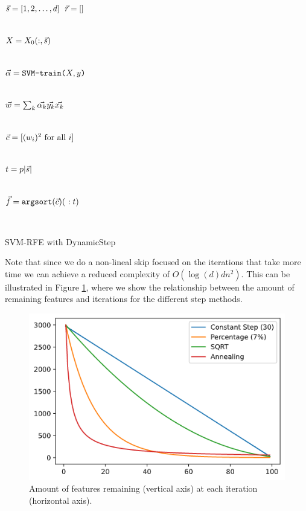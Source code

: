\begin{algorithm}[H]
    \DontPrintSemicolon
      $\vec{s} = [1,2, \dotsc, d]$ 
      $\vec{r} = []$  
        {
            \\
            $X=X_0(:,\vec{s})$\VS

            \\
            $\vec{\alpha} = \texttt{SVM-train(} X, y \texttt{)}$\VS

            \\
            $\vec{w} = \sum_k{\vec{\alpha_k} \vec{y_k} \vec{x_k}}$\VS

            \\
            $\vec{c} = [(w_i)^2 \text{ for all $i$}]$\VS

            \\
            $t = p|\vec{s}|$\VS

            \\
            $\vt{f} = \texttt{argsort}(\vt{c})(\ :t)$\VS

            \\
        }
    \caption{SVM-RFE with DynamicStep}
\end{algorithm}
\VS
Note that since we do a non-lineal skip focused on the iterations that take more time we can achieve a reduced complexity of $O(\log(d)dn^2)$. This can be illustrated in Figure \ref{fig:ch5.dstep.comparetime}, where we show the relationship between the amount of remaining features and iterations for the different step methods. 

\begin{figure}[h]
    \centering
    \includegraphics[width=0.4\linewidth]{img/ch5/comparetimes.png}
    \caption{Amount of features remaining (vertical axis) at each iteration (horizontal axis).}
    \label{fig:ch5.dstep.comparetime}
\end{figure}


